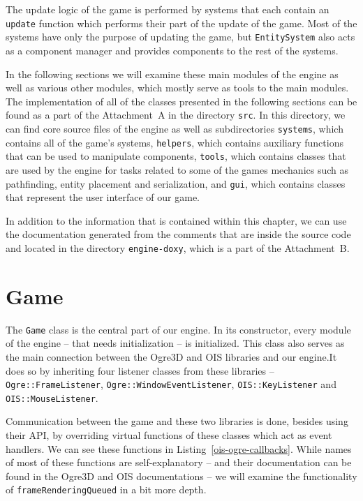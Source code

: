 The update logic of the game is performed by systems that each contain an \texttt{update} function which performs their part of the
update of the game. Most of the systems have only the purpose of updating the game, but \texttt{EntitySystem} also acts as a component
manager and provides components to the rest of the systems.

In the following sections we will examine these main modules of the engine as well as various other modules, which mostly serve as tools
to the main modules. The implementation of all of the classes presented in the following sections can be found as a part of the
Attachment~A in the directory \texttt{src}. In this directory, we can find core source files of the engine as well as subdirectories
\texttt{systems}, which contains all of the game's systems, \texttt{helpers}, which contains auxiliary functions that can be used to
manipulate components, \texttt{tools}, which contains classes that are used by the engine for tasks related to some of the games mechanics
such as pathfinding, entity placement and serialization, and \texttt{gui}, which contains classes that represent the user interface of
our game.

In addition to the information that is contained within this chapter, we can use the documentation generated from the comments that
are inside the source code and located in the directory \texttt{engine-doxy}, which is a part of the Attachment~B.

\section{Game}

The \texttt{Game} class is the central part of our engine. In its constructor, every module of the engine -- that needs initialization --
is initialized. This class also serves as the main connection between the Ogre3D and OIS libraries and our engine.It does so by inheriting
four listener classes from these libraries -- \texttt{Ogre::FrameListener}, \texttt{Ogre::WindowEventListener}, \texttt{OIS::KeyListener}
and \texttt{OIS::MouseListener}.

Communication between the game and these two libraries is done, besides using their API, by overriding virtual functions of these classes
which act as event handlers. We can see these functions in Listing~\ref{ois-ogre-callbacks}. While names of most of these functions are
self-explanatory -- and their documentation can be found in the Ogre3D and OIS documentations -- we will examine the functionality of
\texttt{frameRenderingQueued} in a bit more depth.

